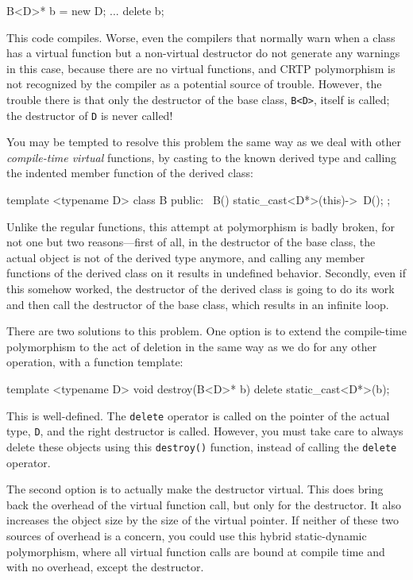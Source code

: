 \begin{code}
B<D>* b = new D;
...
delete b;
\end{code}

This code compiles. Worse, even the compilers that normally warn when a class has a virtual function but a non-virtual destructor do not generate any warnings in this case, because there are no virtual functions, and CRTP polymorphism is not recognized by the compiler as a potential source of trouble. However, the trouble there is that only the destructor of the base class, \texttt{B\textless{}D\textgreater{}}, itself is called; the destructor of \texttt{D} is never called!

You may be tempted to resolve this problem the same way as we deal with other \emph{compile-time virtual} functions, by casting to the known derived type and calling the indented member function of the derived class:

\begin{code}
template <typename D> class B {
  public:
  ~B() { static_cast<D*>(this)->~D(); }
};
\end{code}

Unlike the regular functions, this attempt at polymorphism is badly broken, for not one but two reasons---first of all, in the destructor of the base class, the actual object is not of the derived type anymore, and calling any member functions of the derived class on it results in undefined behavior. Secondly, even if this somehow worked, the destructor of the derived class is going to do its work and then call the destructor of the base class, which results in an infinite loop.

There are two solutions to this problem. One option is to extend the compile-time polymorphism to the act of deletion in the same way as we do for any other operation, with a function template:

\begin{code}
template <typename D> void destroy(B<D>* b) {
  delete static_cast<D*>(b);
}
\end{code}

This is well-defined. The \texttt{delete} operator is called on the pointer of the actual type, \texttt{D}, and the right destructor is called. However, you must take care to always delete these objects using this \texttt{destroy()} function, instead of calling the \texttt{delete} operator.

The second option is to actually make the destructor virtual. This does bring back the overhead of the virtual function call, but only for the destructor. It also increases the object size by the size of the virtual pointer. If neither of these two sources of overhead is a concern, you could use this hybrid static-dynamic polymorphism, where all virtual function calls are bound at compile time and with no overhead, except the destructor.

